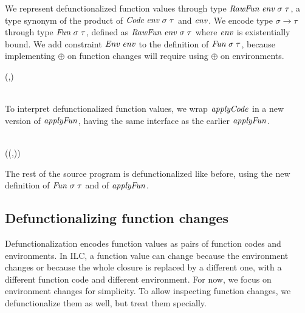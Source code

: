 We represent defunctionalized function values through type \ensuremath{\Conid{RawFun}\;\Varid{env}\;\sigma\;\tau},
a type synonym of the product of \ensuremath{\Conid{Code}\;\Varid{env}\;\sigma\;\tau} and \ensuremath{\Varid{env}}. We encode type \ensuremath{\sigma\to \tau} through type \ensuremath{\Conid{Fun}\;\sigma\;\tau}, defined as \ensuremath{\Conid{RawFun}\;\Varid{env}\;\sigma\;\tau} where
\ensuremath{\Varid{env}} is existentially bound. We add constraint \ensuremath{\Conid{Env}\;\Varid{env}} to the definition of
\ensuremath{\Conid{Fun}\;\sigma\;\tau}, because implementing \ensuremath{\oplus } on function changes will require
using \ensuremath{\oplus } on environments.
\begin{hscode}\SaveRestoreHook
{}%
%
%
\>[B]{}\;\;\;\sigma\;\tau\mathrel{=}(\;\;\sigma\;\tau,){}\<[E]%
\\
\>[B]{}\;\;\sigma\;\tau\;\<[E]%
\\
\>[B]{}\<[3]%
\>[3]{}\mathrel{:\mkern-1mu:}\;\Rightarrow{}\;\;\sigma\;\tau\to {}\;\sigma\;\tau{}\<[E]%
\ColumnHook
\end{hscode}\resethooks
To interpret defunctionalized function values, we wrap \ensuremath{\Varid{applyCode}} in a new
version of \ensuremath{\Varid{applyFun}}, having the same interface as the earlier \ensuremath{\Varid{applyFun}}.
\begin{hscode}\SaveRestoreHook
{}%
%
\>[B]{}\mathrel{:\mkern-1mu:}\;\sigma\;\tau\to \sigma\to \tau{}\<[E]%
\\
\>[B]{}\;(\;(,))\;\mathrel{=}\;\;\;\<[E]%
\ColumnHook
\end{hscode}\resethooks
The rest of the source program is defunctionalized like before, using the new
definition of \ensuremath{\Conid{Fun}\;\sigma\;\tau} and of \ensuremath{\Varid{applyFun}}.


\subsection{Defunctionalizing function changes}
\label{sec:defunc-func-changes}
Defunctionalization encodes function values as pairs of function codes and
environments. In ILC, a function value can change because the environment
changes or because the whole closure is replaced by a different one, with a
different function code and different environment. For now, we focus on
environment changes for simplicity. To allow inspecting function changes, we
defunctionalize them as well, but treat them specially.

